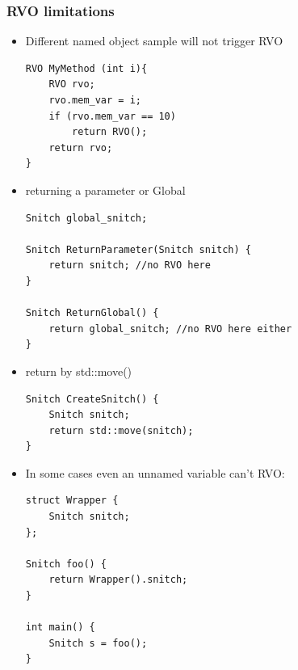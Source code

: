 \documentclass[a4paper,11pt,twoside]{book}
\begin{document}
\subsubsection{RVO limitations}
\begin{itemize}
	\item Different named object sample will not trigger RVO
\begin{lstlisting}[numbers=none]
RVO MyMethod (int i){
	RVO rvo;
	rvo.mem_var = i;
	if (rvo.mem_var == 10)
		return RVO();
	return rvo; 
}
\end{lstlisting}
	
	\item returning a parameter or Global
\begin{lstlisting}[numbers=none]
Snitch global_snitch;

Snitch ReturnParameter(Snitch snitch) {
	return snitch; //no RVO here
}

Snitch ReturnGlobal() {
	return global_snitch; //no RVO here either
}
\end{lstlisting}

\item return by std::move()
\begin{lstlisting}[numbers=none]
Snitch CreateSnitch() {
	Snitch snitch;
	return std::move(snitch);
}
\end{lstlisting}
	
\item In some cases even an unnamed variable can't RVO:
\begin{lstlisting}[numbers=none]
struct Wrapper {
	Snitch snitch;
};

Snitch foo() {
	return Wrapper().snitch;
}

int main() {
	Snitch s = foo();
}
\end{lstlisting}

\end{itemize}
\end{document}
